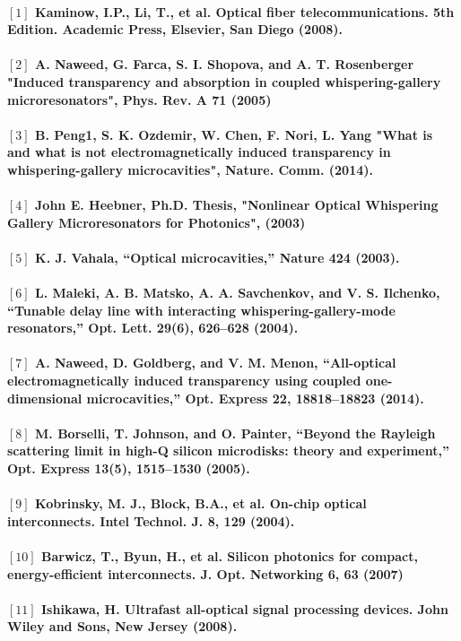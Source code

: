 \paragraph{\normalfont \large $[1]$  Kaminow, I.P., Li, T., et al. Optical fiber telecommunications. 5th Edition. Academic Press, Elsevier, San Diego (2008). \\ 
\\$[2]$ A. Naweed, G. Farca, S. I. Shopova, and A. T. Rosenberger "Induced transparency and absorption in coupled whispering-gallery microresonators", Phys. Rev. A \textbf{71} (2005)\\
\\$[3]$ B. Peng1, S. K. Ozdemir, W. Chen, F. Nori, L. Yang "What is and what is not electromagnetically induced transparency in whispering-gallery microcavities", Nature. Comm. (2014). \\
\\$[4]$ John E. Heebner, Ph.D. Thesis, "Nonlinear Optical Whispering Gallery Microresonators for Photonics", (2003)  \\
\\$[5]$ K. J. Vahala, “Optical microcavities,” Nature \textbf{424} (2003).\\
\\$[6]$ L. Maleki, A. B. Matsko, A. A. Savchenkov, and V. S. Ilchenko, “Tunable delay line with interacting
whispering-gallery-mode resonators,” Opt. Lett. 29(6), 626–628 (2004).\\
\\$[7]$ A. Naweed, D. Goldberg, and V. M. Menon, “All-optical electromagnetically induced transparency using
coupled one-dimensional microcavities,” Opt. Express 22, 18818–18823 (2014).\\
\\$[8]$ M. Borselli, T. Johnson, and O. Painter, “Beyond the Rayleigh scattering limit in high-Q silicon microdisks:
theory and experiment,” Opt. Express 13(5), 1515–1530 (2005).\\
\\$[9]$ Kobrinsky, M. J., Block, B.A., et al. On-chip optical interconnects. Intel Technol. J. \textbf{8}, 129 (2004).\\
\\$[10]$ Barwicz, T., Byun, H., et al. Silicon photonics for compact, energy-efficient interconnects. J. Opt. Networking \textbf{6}, 63 (2007)\\
\\$[11]$ Ishikawa, H. Ultrafast all-optical signal processing devices. John Wiley and Sons, New Jersey (2008). \\
}

